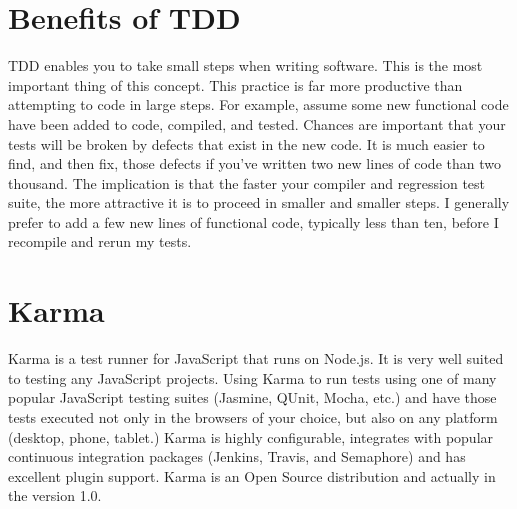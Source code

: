 \documentclass[11pt]{article}
\begin{document}
\section{Benefits of TDD}

TDD enables you to take small steps when writing software. This is the most important thing of this concept. This practice is far more productive than attempting to code in large steps. For example, assume some new functional code have been added to code, compiled, and tested. Chances are important that your tests will be broken by defects that exist in the new code. It is much easier to find, and then fix, those defects if you've written two new lines of code than two thousand. The implication is that the faster your compiler and regression test suite, the more attractive it is to proceed in smaller and smaller steps. I generally prefer to add a few new lines of functional code, typically less than ten, before I recompile and rerun my tests.


\section{Karma}

Karma is a test runner for JavaScript that runs on Node.js. It is very well suited to testing any JavaScript projects. Using Karma to run tests using one of many popular JavaScript testing suites (Jasmine, QUnit, Mocha, etc.) and have those tests executed not only in the browsers of your choice, but also on any platform (desktop, phone, tablet.) Karma is highly configurable, integrates with popular continuous integration packages (Jenkins, Travis, and Semaphore) and has excellent plugin support. Karma is an Open Source distribution and actually in the version 1.0.
\end{document}

